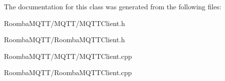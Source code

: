 The documentation for this class was generated from the following files\+:\begin{DoxyCompactItemize}
\item 
Roomba\+M\+Q\+T\+T/\+M\+Q\+T\+T/M\+Q\+T\+T\+Client.\+h\item 
Roomba\+M\+Q\+T\+T/Roomba\+M\+Q\+T\+T\+Client.\+h\item 
Roomba\+M\+Q\+T\+T/\+M\+Q\+T\+T/M\+Q\+T\+T\+Client.\+cpp\item 
Roomba\+M\+Q\+T\+T/Roomba\+M\+Q\+T\+T\+Client.\+cpp\end{DoxyCompactItemize}
